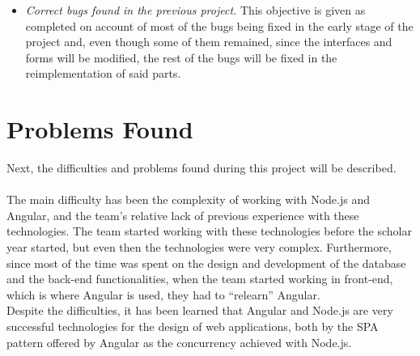 \documentclass[11pt]{book}
\begin{document}
\begin{itemize}
	\item \emph{Correct bugs found in the previous project.}
This objective is given as completed on account of most of the bugs being fixed in the early stage of the project and, even though some of them remained, since the interfaces and forms will be modified, the rest of the bugs will be fixed in the reimplementation of said parts.
\end{itemize}

\section{Problems Found}
Next, the difficulties and problems found during this project will be described.\\\\
The main difficulty has been the complexity of working with Node.js and Angular, and the team's relative lack of previous experience with these technologies. The team started working with these technologies before the scholar year started, but even then the technologies were very complex. Furthermore, since most of the time was spent on the design and development of the database and the back-end functionalities, when the team started working in front-end, which is where Angular is used, they had to ``relearn'' Angular.\\
Despite the difficulties, it has been learned that Angular and Node.js are very successful technologies for the design of web applications, both by the SPA pattern offered by Angular as the concurrency achieved with Node.js.
\end{document}
